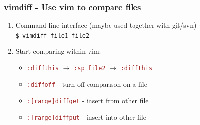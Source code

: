 \documentclass{beamer}
\newcommand{\vimcommand}[1]{\texttt{\textcolor{brown}{#1}}}
\begin{document}
\begin{frame}
    \frametitle{vimdiff - Use vim to compare files}
    \begin{enumerate}
      \item Command line interface (maybe used together with git/svn)\\
        \texttt{\$ vimdiff file1 file2}
      \item Start comparing within vim:
          \begin{itemize}
            \item \vimcommand{:diffthis} $\rightarrow$ \vimcommand{:sp file2} $\rightarrow$ \vimcommand{:diffthis}
            \item \vimcommand{:diffoff} - turn off comparison on a file
            \item \vimcommand{:[range]diffget} - insert from other file
            \item \vimcommand{:[range]diffput} - insert into other file
          \end{itemize}
    \end{enumerate}
\end{frame}
\end{document}
